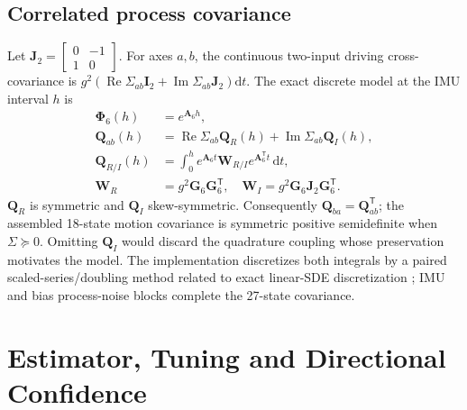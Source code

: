 \documentclass[conference]{IEEEtran}
\newcommand{\mat}[1]{\bm{#1}}
\newcommand{\T}{^{\mathsf T}}
\newcommand{\Rea}{\operatorname{Re}}
\newcommand{\Ima}{\operatorname{Im}}
\begin{document}
\subsection{Correlated process covariance}
Let $\mat J_2=\left[\begin{smallmatrix}0&-1\\1&0\end{smallmatrix}\right]$.
For axes $a,b$, the continuous two-input driving cross-covariance is
$g^2(\Rea\Sigma_{ab}\mat I_2+
\Ima\Sigma_{ab}\mat J_2)\mathrm dt$.
The exact discrete model at the IMU interval $h$ is
\begin{align}
 \mat\Phi_6(h)&=e^{\mat A_6h},\\
 \mat Q_{ab}(h)&=\Rea\Sigma_{ab}\mat Q_R(h)
                   +\Ima\Sigma_{ab}\mat Q_I(h), \label{eq:Qab}\\
 \mat Q_{R/I}(h)&=\int_0^h e^{\mat A_6t}\mat W_{R/I}
                                    e^{\mat A_6\T t}\,\mathrm dt,\\
 \mat W_R&=g^2\mat G_6\mat G_6\T,\quad
 \mat W_I=g^2\mat G_6\mat J_2\mat G_6\T.
\end{align}
$\mat Q_R$ is symmetric and $\mat Q_I$ skew-symmetric. Consequently
$\mat Q_{ba}=\mat Q_{ab}\T$; the assembled 18-state motion covariance
is symmetric positive semidefinite when $\Sigma\succeq0$. Omitting
$\mat Q_I$ would discard the quadrature coupling whose preservation
motivates the model. The implementation discretizes both integrals by a
paired scaled-series/doubling method related to exact linear-SDE
discretization \cite{vanloan78}; IMU and bias process-noise blocks complete
the 27-state covariance.

\section{Estimator, Tuning and Directional Confidence}
\label{sec:method}
\end{document}
